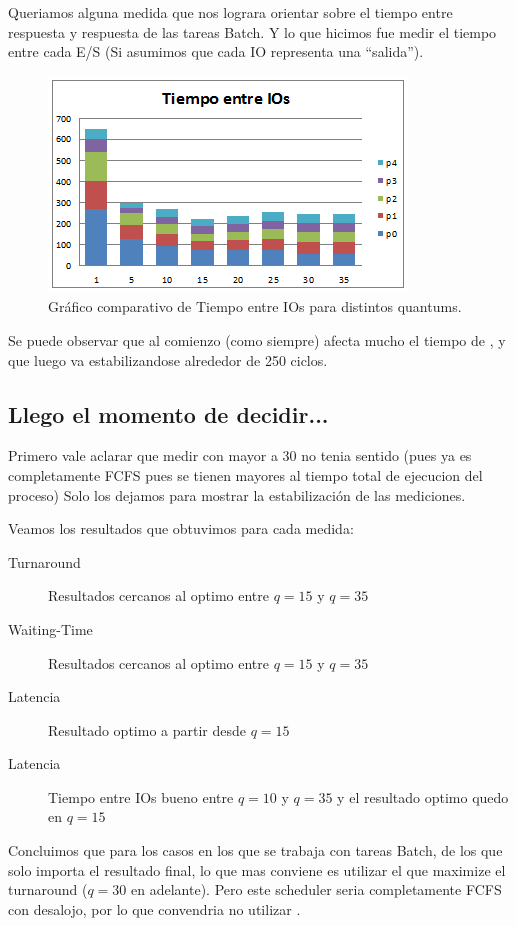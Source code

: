 Queriamos alguna medida que nos lograra orientar sobre el tiempo entre respuesta y respuesta de las tareas Batch. Y lo que hicimos fue medir el tiempo entre cada E/S (Si asumimos que cada IO representa una ``salida'').

\begin{figure}[H]
  \centering
    \includegraphics{img/tiempoEntreIOs.png}
    \caption{Gr\'afico comparativo de Tiempo entre IOs para distintos quantums.}
\end{figure}

Se puede observar que al comienzo (como siempre) afecta mucho el tiempo de \cs, y que luego va estabilizandose alrededor de 250 ciclos.

\subsection{Llego el momento de decidir... }

Primero vale aclarar que medir con \quantum mayor a 30 no tenia sentido (pues ya es completamente FCFS pues se tienen \quantums mayores al tiempo total de ejecucion del proceso) Solo los dejamos para mostrar la estabilizaci\'on de las mediciones.

Veamos los resultados que obtuvimos para cada medida:

\begin{description}
 \item[Turnaround] Resultados cercanos al optimo entre $q=15$ y $q=35$
 \item[Waiting-Time] Resultados cercanos al optimo entre $q=15$ y $q=35$
 \item[Latencia] Resultado optimo a partir desde $q=15$
 \item[Latencia] Tiempo entre IOs bueno entre $q=10$ y $q=35$ y el resultado optimo quedo en $q=15$
\end{description}

Concluimos que para los casos en los que se trabaja con tareas Batch, de los que solo importa el resultado final, lo que mas conviene es utilizar el \quantum que maximize el turnaround ($q=30$ en adelante). Pero este scheduler seria completamente FCFS con desalojo, por lo que convendria no utilizar \rr.

